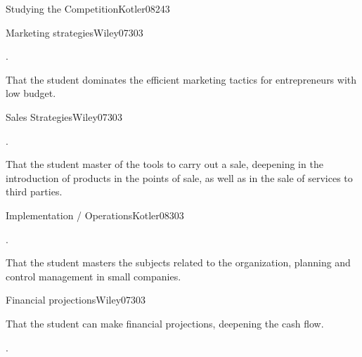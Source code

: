 \begin{syllabus}
\begin{unit}{Studying the Competition}{}{Kotler08}{24}{3}
\end{unit}

\begin{unit}{Marketing strategies}{}{Wiley07}{30}{3}
   \begin{topics}
      \item . 
   \end{topics}

   \begin{learningoutcomes}
      \item That the student dominates the efficient marketing tactics for entrepreneurs with low budget.
   \end{learningoutcomes}
\end{unit}

\begin{unit}{Sales Strategies}{}{Wiley07}{30}{3}
   \begin{topics}
      \item .
   \end{topics}

   \begin{learningoutcomes}
      \item That the student master of the tools to carry out a sale, deepening in the introduction of products in the points of sale, as well as in the sale of services to third parties.
   \end{learningoutcomes}
\end{unit}

\begin{unit}{Implementation / Operations}{}{Kotler08}{30}{3}
   \begin{topics}
      \item . 
   \end{topics}

   \begin{learningoutcomes}
      \item That the student masters the subjects related to the organization, planning and control management in small companies.
   \end{learningoutcomes}

\end{unit}

\begin{unit}{Financial projections}{}{Wiley07}{30}{3}
   \begin{topics}
      \item That the student can make financial projections, deepening the cash flow.
   \end{topics}

   \begin{learningoutcomes}
      \item .
   \end{learningoutcomes}
\end{unit}

\begin{coursebibliography}
\end{coursebibliography}

\end{syllabus}
